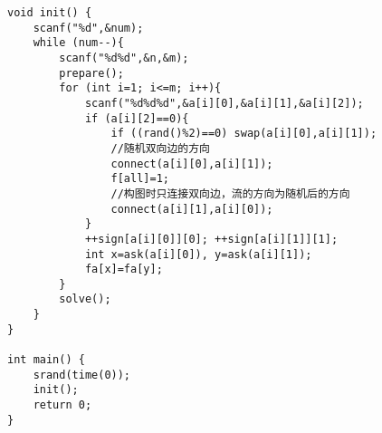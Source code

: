 \begin{verbatim}
void init() {
    scanf("%d",&num);
    while (num--){
        scanf("%d%d",&n,&m);
        prepare();
        for (int i=1; i<=m; i++){
            scanf("%d%d%d",&a[i][0],&a[i][1],&a[i][2]);
            if (a[i][2]==0){
                if ((rand()%2)==0) swap(a[i][0],a[i][1]);
                //随机双向边的方向
                connect(a[i][0],a[i][1]);
                f[all]=1;
                //构图时只连接双向边，流的方向为随机后的方向
                connect(a[i][1],a[i][0]);
            }
            ++sign[a[i][0]][0]; ++sign[a[i][1]][1];
            int x=ask(a[i][0]), y=ask(a[i][1]);
            fa[x]=fa[y];
        }
        solve();
    }
}

int main() {
    srand(time(0));
    init();
    return 0;
}
\end{verbatim} 
